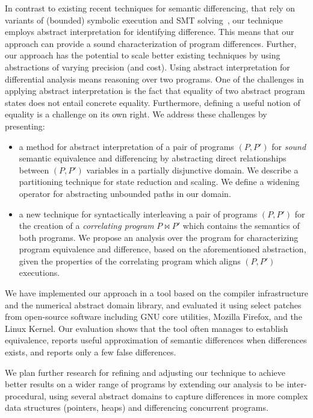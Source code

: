 In contrast to existing recent techniques for semantic differencing, that rely on variants of (bounded) symbolic execution and SMT solving~\cite{DwyerElbaumPerson08,GodlinStrichman09,EnglerRamos11,HawblitzelKawaguchiLahiriRebelo12}, our technique employs abstract interpretation for identifying difference. This means that our approach can provide a sound characterization of program differences. Further, our approach has the potential to scale better existing techniques by using abstractions of varying precision (and cost). Using abstract interpretation for differential analysis means reasoning over two programs. One of the challenges in applying abstract interpretation is the fact that equality of two abstract program states does not entail concrete equality. Furthermore, defining a useful notion of equality is a challenge on its own right.
We address these challenges by presenting:
\begin{itemize}
\item a method for abstract interpretation of a pair of programs $(P,P')$ for \emph{sound} semantic equivalence and differencing by abstracting direct relationships between $(P,P')$ variables in a partially disjunctive domain. We describe a partitioning technique for state reduction and scaling. We define a widening operator for abstracting unbounded paths in our domain.
\item a new technique for syntactically interleaving a pair of programs $(P,P')$ for the creation of a \emph{correlating program} $P \bowtie P'$ which contains the semantics of both programs. We propose an analysis over the program for characterizing program equivalence and difference, based on the aforementioned abstraction, given the properties of the correlating program which aligns $(P,P')$ executions.
\end{itemize}

We have implemented our approach in a tool based on the  compiler infrastructure and the  numerical abstract domain library, and evaluated it using select patches from open-source software including GNU core utilities, Mozilla Firefox, and the Linux Kernel. Our evaluation shows that the tool often manages to establish equivalence, reports useful approximation of semantic differences when differences exists, and reports only a few false differences.

We plan further research for refining and adjusting our technique to achieve better results on a wider range of programs by extending our analysis to be inter-procedural, using several abstract domains to capture differences in more complex data structures (pointers, heaps) and differencing concurrent programs.

